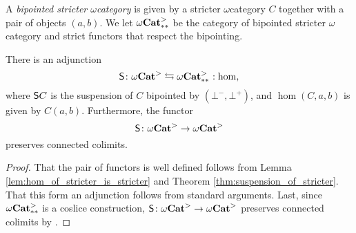 \begin{dfn} 
    A \emph{bipointed stricter \( \omega \)\nbd category} is given by a stricter \( \omega \)\nbd category \( C \) together with a pair of objects \( (a, b) \).
    We let \( {\omega\mathbf{Cat}}^>_{**} \) be the category of bipointed stricter \( \omega \)\nbd category and strict functors that respect the bipointing.
\end{dfn}

\begin{cor} \label{cor:adjunction_hom_suspension}
    There is an adjunction
    \begin{equation*}
        \sus{} \colon \somegaCat \leftrightarrows \bpt\somegaCat \cocolon \hom,
    \end{equation*}
    where \( \mathsf{S}{C} \) is the suspension of \( C \) bipointed by \( (\bot^-, \bot^+) \), and \( \hom(C, a, b) \) is given by \( C(a, b) \).
    Furthermore, the functor
    \begin{equation*}
        \mathsf{S}{} \colon {\omega\mathbf{Cat}}^> \to {\omega\mathbf{Cat}}^>
    \end{equation*}
    preserves connected colimits.
\end{cor}
\begin{proof}
    That the pair of functors is well defined follows from Lemma \ref{lem:hom_of_stricter_is_stricter} and Theorem \ref{thm:suspension_of_stricter}.
    That this form an adjunction follows from standard arguments.
    Last, since \( {\omega\mathbf{Cat}}^>_{**} \) is a coslice construction, \( \mathsf{S}{} \colon {\omega\mathbf{Cat}}^> \to {\omega\mathbf{Cat}}^> \) preserves connected colimits by \cite[Proposition 3.3.8]{riehl2019context}.
\end{proof}

